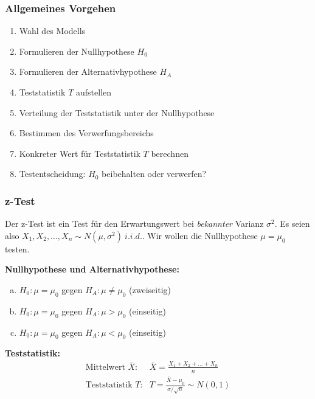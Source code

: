 \documentclass[10pt,a4paper,twocolumn]{article}
\begin{document}
\subsubsection{Allgemeines Vorgehen}
\begin{enumerate}
\item Wahl des Modells
\item Formulieren der Nullhypothese $H_0$
\item Formulieren der Alternativhypothese $H_A$
\item Teststatistik $T$ aufstellen
\item Verteilung der Teststatistik unter der Nullhypothese
\item Bestimmen des Verwerfungsbereichs
\item Konkreter Wert für Teststatistik $T$ berechnen
\item Testentscheidung: $H_0$ beibehalten oder verwerfen?
\end{enumerate}

\subsubsection{z-Test}
Der z-Test ist ein Test für den Erwartungswert bei \emph{bekannter} Varianz $\sigma^2$. Es seien also $X_1,X_2,...,X_n \sim N(\mu,\sigma^2)\ i.i.d.$. Wir wollen die Nullhypothese $\mu=\mu_0$ testen.

\vspace{10pt}

\textbf{Nullhypothese und Alternativhypothese:}
\begin{enumerate}[a)]
\item $H_0: \mu=\mu_0$ gegen $H_A:\mu\neq \mu_0$ (zweiseitig)
\item $H_0: \mu=\mu_0$ gegen $H_A:\mu > \mu_0$ (einseitig)
\item $H_0: \mu=\mu_0$ gegen $H_A:\mu < \mu_0$ (einseitig)
\end{enumerate}

\vspace{10pt}

\textbf{Teststatistik:}
\[
\begin{array}{ll}
	\text{Mittelwert $\overline{X}$:} & \overline{X}=\frac{X_1+X_2+...+X_n}{n} \\
	\text{Teststatistik $T$:} & T = \frac{\overline{X}-\mu_0}{\sigma/\sqrt{n}}\sim N(0,1) \\
\end{array}
\]

\vspace{10pt}
\end{document}
